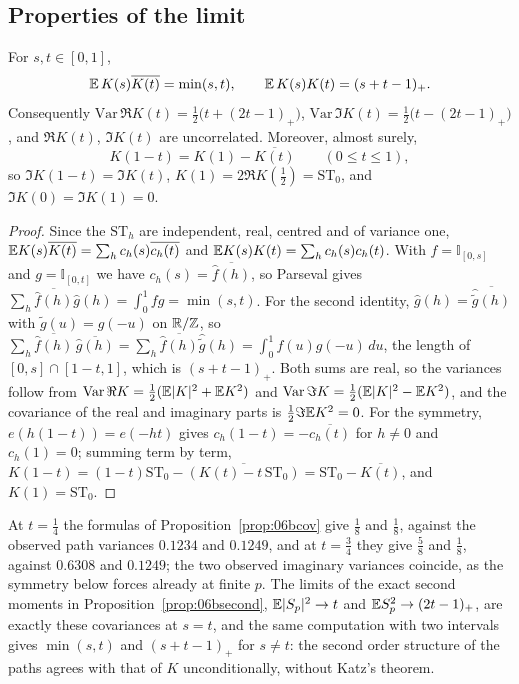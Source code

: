 \subsection{Properties of the limit}

\begin{proposition}\label{prop:06bcov}
For $s,t\in[0,1]$,
\[
\mathbb{E}\,K(s)\overline{K(t)}=\min(s,t),\qquad\mathbb{E}\,K(s)K(t)=(s+t-1)_+ .
\]
Consequently $\mathrm{Var}\,\Re K(t)=\frac12\bigl(t+(2t-1)_+\bigr)$, $\mathrm{Var}\,\Im K(t)=\frac12\bigl(t-(2t-1)_+\bigr)$, and $\Re K(t)$, $\Im K(t)$ are uncorrelated. Moreover, almost surely,
\[
K(1-t)=K(1)-\overline{K(t)}\qquad(0\le t\le1),
\]
so $\Im K(1-t)=\Im K(t)$, $K(1)=2\Re K(\frac12)=\mathrm{ST}_0$, and $\Im K(0)=\Im K(1)=0$.
\end{proposition}

\begin{proof}
Since the $\mathrm{ST}_h$ are independent, real, centred and of variance one, $\mathbb{E} K(s)\overline{K(t)}=\sum_hc_h(s)\overline{c_h(t)}$ and $\mathbb{E} K(s)K(t)=\sum_hc_h(s)c_h(t)$. With $f=\mathbb{I}_{[0,s]}$ and $g=\mathbb{I}_{[0,t]}$ we have $c_h(s)=\overline{\hat f(h)}$, so Parseval gives $\sum_h\overline{\hat f(h)}\hat g(h)=\int_0^1fg=\min(s,t)$. For the second identity, $\hat g(h)=\overline{\hat{\tilde g}(h)}$ with $\tilde g(u)=g(-u)$ on $\mathbb{R}/\mathbb{Z}$, so $\sum_h\overline{\hat f(h)}\,\overline{\hat g(h)}=\sum_h\overline{\hat f(h)}\hat{\tilde g}(h)=\int_0^1f(u)g(-u)\,du$, the length of $[0,s]\cap[1-t,1]$, which is $(s+t-1)_+$. Both sums are real, so the variances follow from $\mathrm{Var}\,\Re K=\frac12(\mathbb{E}|K|^2+\mathbb{E} K^2)$ and $\mathrm{Var}\,\Im K=\frac12(\mathbb{E}|K|^2-\mathbb{E} K^2)$, and the covariance of the real and imaginary parts is $\frac12\Im\mathbb{E} K^2=0$. For the symmetry, $e(h(1-t))=e(-ht)$ gives $c_h(1-t)=-\overline{c_h(t)}$ for $h\ne0$ and $c_h(1)=0$; summing term by term, $K(1-t)=(1-t)\mathrm{ST}_0-\overline{(K(t)-t\,\mathrm{ST}_0)}=\mathrm{ST}_0-\overline{K(t)}$, and $K(1)=\mathrm{ST}_0$.
\end{proof}

At $t=\frac14$ the formulas of Proposition~\ref{prop:06bcov} give $\frac18$ and $\frac18$, against the observed path variances $0.1234$ and $0.1249$, and at $t=\frac34$ they give $\frac58$ and $\frac18$, against $0.6308$ and $0.1249$; the two observed imaginary variances coincide, as the symmetry below forces already at finite $p$. The limits of the exact second moments in Proposition~\ref{prop:06bsecond}, $\mathbb{E}|S_p|^2\to t$ and $\mathbb{E} S_p^2\to(2t-1)_+$, are exactly these covariances at $s=t$, and the same computation with two intervals gives $\min(s,t)$ and $(s+t-1)_+$ for $s\ne t$: the second order structure of the paths agrees with that of $K$ unconditionally, without Katz's theorem.

